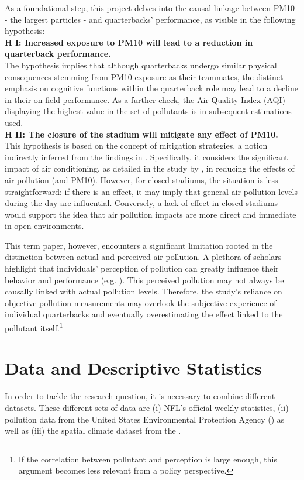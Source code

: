 \documentclass[12pt,a4paper]{article}
\begin{document}
As a foundational step, this project delves into the causal linkage between PM10 - the largest particles - and quarterbacks' performance, as visible in the following hypothesis: \\[0.2cm]
\textbf{H I: Increased exposure to PM10 will lead to a reduction in quarterback performance. } \\[0.2cm]
The hypothesis implies that although quarterbacks undergo similar physical consequences stemming from PM10 exposure as their teammates, the distinct emphasis on cognitive functions within the quarterback role may lead to a decline in their on-field performance. As a further check, the Air Quality Index (AQI) displaying the highest value in the set of pollutants is in subsequent estimations used. \\[0.2cm]
\textbf{H II: The closure of the stadium will mitigate any effect of PM10.} \\[0.2cm]
This hypothesis is based on the concept of mitigation strategies, a notion indirectly inferred from the findings in \citet{deschenes2017}. Specifically, it considers the significant impact of air conditioning, as detailed in the study by \citet{lin2013}, in reducing the effects of air pollution (and PM10). However, for closed stadiums, the situation is less straightforward: if there is an effect, it may imply that general air pollution levels during the day are influential. Conversely, a lack of effect in closed stadiums would support the idea that air pollution impacts are more direct and immediate in open environments.

This term paper, however, encounters a significant limitation rooted in the distinction between actual and perceived air pollution. A plethora of scholars highlight that individuals' perception of pollution can greatly influence their behavior and performance (e.g. \citealp{rehdanz2008,schumacher2008,mackerron2009,chiarini2020,gong2020,claeson2013}). This perceived pollution may not always be causally linked with actual pollution levels. Therefore, the study's reliance on objective pollution measurements may overlook the subjective experience of individual quarterbacks and eventually overestimating the effect linked to the pollutant itself.\footnote{If the correlation between pollutant and perception is large enough, this argument becomes less relevant from a policy perspective.}

\clearpage

\section{Data and Descriptive Statistics}
\label{3}
In order to tackle the research question, it is necessary to combine different datasets. These different sets of data are (i) NFL's official weekly statistics, (ii) pollution data from the United States Environmental Protection Agency (\citeauthor{EPA}) as well as (iii) the spatial climate dataset from the \citeauthor{PRISM}. 
\end{document}

